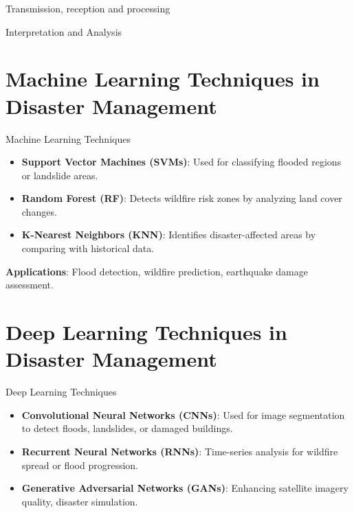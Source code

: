 \documentclass[10pt]{beamer}
\begin{document}
\begin{frame}{Transmission, reception and processing}

\end{frame}
\begin{frame}{Interpretation and Analysis}
\end{frame}

\section{Machine Learning Techniques in Disaster Management}
\begin{frame}{Machine Learning Techniques}
    \begin{itemize}
        \item \textbf{Support Vector Machines (SVMs)}: Used for classifying flooded regions or landslide areas.
        \item \textbf{Random Forest (RF)}: Detects wildfire risk zones by analyzing land cover changes.
        \item \textbf{K-Nearest Neighbors (KNN)}: Identifies disaster-affected areas by comparing with historical data.
    \end{itemize}
    \vspace{5mm}
    \textbf{Applications}: Flood detection, wildfire prediction, earthquake damage assessment.
\end{frame}

\section{Deep Learning Techniques in Disaster Management}
\begin{frame}{Deep Learning Techniques}
    \begin{itemize}
        \item \textbf{Convolutional Neural Networks (CNNs)}: Used for image segmentation to detect floods, landslides, or damaged buildings.
        \item \textbf{Recurrent Neural Networks (RNNs)}: Time-series analysis for wildfire spread or flood progression.
        \item \textbf{Generative Adversarial Networks (GANs)}: Enhancing satellite imagery quality, disaster simulation.
    \end{itemize}
\end{frame}

\end{document}
